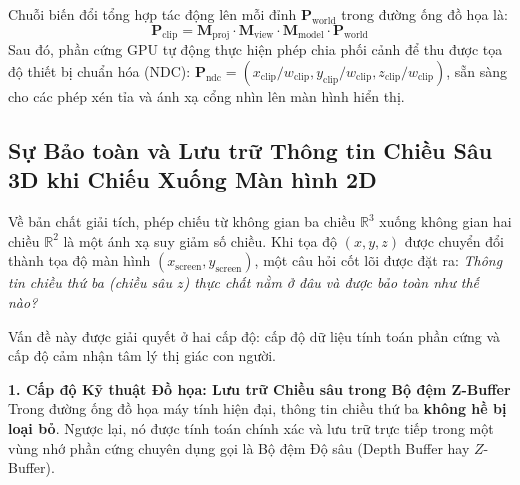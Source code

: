 Chuỗi biến đổi tổng hợp tác động lên mỗi đỉnh $\mathbf{P}_{\text{world}}$ trong đường ống đồ họa là:
\begin{equation}
\mathbf{P}_{\text{clip}} = \mathbf{M}_{\text{proj}} \cdot \mathbf{M}_{\text{view}} \cdot \mathbf{M}_{\text{model}} \cdot \mathbf{P}_{\text{world}}
\end{equation}
Sau đó, phần cứng GPU tự động thực hiện phép chia phối cảnh để thu được tọa độ thiết bị chuẩn hóa (NDC): $\mathbf{P}_{\text{ndc}} = (x_{\text{clip}}/w_{\text{clip}}, y_{\text{clip}}/w_{\text{clip}}, z_{\text{clip}}/w_{\text{clip}})$, sẵn sàng cho các phép xén tỉa và ánh xạ cổng nhìn lên màn hình hiển thị.

\subsection{Sự Bảo toàn và Lưu trữ Thông tin Chiều Sâu 3D khi Chiếu Xuống Màn hình 2D}
\label{subsec:3d_information_in_2d_projection}

Về bản chất giải tích, phép chiếu từ không gian ba chiều $\mathbb{R}^3$ xuống không gian hai chiều $\mathbb{R}^2$ là một ánh xạ suy giảm số chiều. Khi tọa độ $(x, y, z)$ được chuyển đổi thành tọa độ màn hình $(x_{\text{screen}}, y_{\text{screen}})$, một câu hỏi cốt lõi được đặt ra: \textit{Thông tin chiều thứ ba (chiều sâu $z$) thực chất nằm ở đâu và được bảo toàn như thế nào?}

Vấn đề này được giải quyết ở hai cấp độ: cấp độ dữ liệu tính toán phần cứng và cấp độ cảm nhận tâm lý thị giác con người.

\textbf{1. Cấp độ Kỹ thuật Đồ họa: Lưu trữ Chiều sâu trong Bộ đệm Z-Buffer}
Trong đường ống đồ họa máy tính hiện đại, thông tin chiều thứ ba \textbf{không hề bị loại bỏ}. Ngược lại, nó được tính toán chính xác và lưu trữ trực tiếp trong một vùng nhớ phần cứng chuyên dụng gọi là Bộ đệm Độ sâu (Depth Buffer hay $Z$-Buffer).

